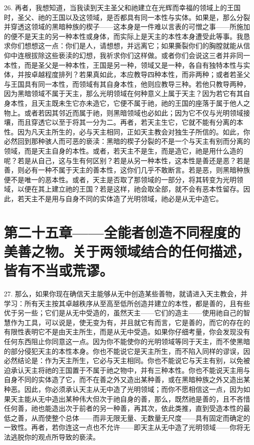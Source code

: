 26. 再者，我想知道，当我读到天主圣父和祂建立在光辉而幸福的领域上的王国时，圣父、祂的王国以及这领域，是否都具有同一本性与实体。如果是，那么分裂并穿透这领域的黑暗种族的楔子——这本身是一件难以言表的可憎之事——所施加的便不是天主的另一种本性或身体，而实际上是天主的本性本身遭受此等事。我恳求你们想想这一点：你们是人，请想想，并远离它；如果撕裂你们的胸膛就能从信仰中连根拔除这些亵渎的幻想，我祈求你们这样做。或者你们会说这三者并非同一本性，而是圣父是一种本性，王国是另一种，领域又是一种，各自有独特本性与实体，并按卓越程度排列？若果真如此，本应教导四种本性，而非两种；或者若圣父与王国具有同一本性，而领域有其自身本性，他则应教导三种。若他只教导两种，因为黑暗领域不属于天主，那么光明领域在何种意义上属于天主？因为若它有其自身本性，且天主既未生它亦未造它，它便不属于祂，祂的王国的座落于属于他人之物上。或者若因其邻近而属于祂，则黑暗领域也必如此；因为它不仅与光明领域接壤，而且穿透它以至于将其一分为二。再者，若天主生它，它就不能有分离的本性。因为凡天主所生的，必与天主相同，正如天主教会对独生子所信的。如此，你必然回到那种骇人而可恶的亵渎：黑暗的楔子分裂的不是一个与天主有别而分离的领域，而是天主自身的本性。或者，若天主不是生，而是造它，祂是用什么造的呢？若是从自己，这与生有何区别？若是从另一种本性，这本性是善还是恶？若是善，则必有一种不属于天主的善本性，这你们几乎不敢断言。若是恶，则黑暗种族便不是唯一的恶本性。或者，天主是否取了那领域的一部分，将其转变为光明领域，以便在其上建立祂的王国？若是这样，祂会取全部，就不会有恶本性留存。因此，若天主不是用与自身不同的实体造了光明领域，祂必是从无中造它。\par


\section{第二十五章——全能者创造不同程度的美善之物。关于两领域结合的任何描述，皆有不当或荒谬。}

27. 那么，如果你现在确信天主能够从无中创造某些善物，就请进入天主教会，并学习：所有天主按其卓越秩序从至高至低所创造并建立的本性，都是善的，且有些优于另一些；它们是从无中受造的，虽然天主——它们的造主——使用祂自己的智慧作为工具，可以说是，使无变为有，并且就它有而言，它是善的，而它的存在的有限性表明它不是由天主所生，而是从无中受造。如果你仔细考量，你会发现没有任何东西阻止你同意这一点。因为你不能使你的光明领域等同于天主，而不使黑暗的部分侵犯天主的本性本身。你也不能说它是天主所生，而不陷入同样的谬误，因必然结论是：作为天主所生，它必与天主相同。你也不能说它与天主有别，以免被迫承认天主将祂的王国置于不属于祂之物中，并有三种本性。你也不能说天主用与自身不同的实体造了它，而不在善之外又造出某种善，或在黑暗种族之外又造出某种恶。因此，你必须承认天主从无中造了光明领域；而你不愿相信这一点，因为如果天主能从无中造出某种伟大但次于祂自身的善，那么，既然祂是善的，且不吝惜任何善，祂也能造出次于前者的另一种善，再其次，依此类推，直到受造本性的最低之善，从而使整个总体——而非无限无量、无数量无尺度——具有固定而确定的一致性。再者，若你连这一点也不允许——即天主从无中造了光明领域——你将无法逃脱你的观点所导致的亵渎。\par

